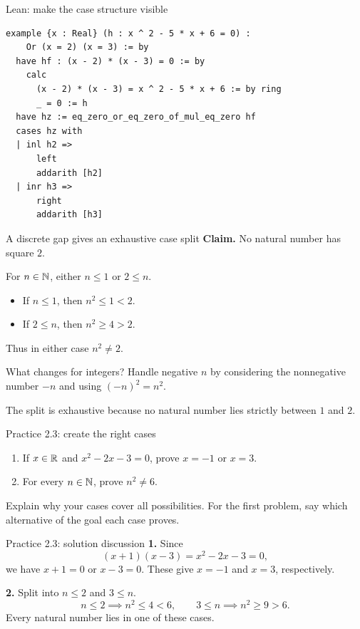 \begin{frame}[fragile]{Lean: make the case structure visible}
\begin{lstlisting}
example {x : Real} (h : x ^ 2 - 5 * x + 6 = 0) :
    Or (x = 2) (x = 3) := by
  have hf : (x - 2) * (x - 3) = 0 := by
    calc
      (x - 2) * (x - 3) = x ^ 2 - 5 * x + 6 := by ring
      _ = 0 := h
  have hz := eq_zero_or_eq_zero_of_mul_eq_zero hf
  cases hz with
  | inl h2 =>
      left
      addarith [h2]
  | inr h3 =>
      right
      addarith [h3]
\end{lstlisting}
\end{frame}

\begin{frame}{A discrete gap gives an exhaustive case split}
\textbf{Claim.} No natural number has square $2$.

For $n\in\mathbb{N}$, either $n\le1$ or $2\le n$.
\begin{itemize}
\item If $n\le1$, then $n^2\le1<2$.
\item If $2\le n$, then $n^2\ge4>2$.
\end{itemize}
Thus in either case $n^2\ne2$.
\begin{block}{What changes for integers?}
Handle negative $n$ by considering the nonnegative number $-n$ and using $(-n)^2=n^2$.
\end{block}
The split is exhaustive because no natural number lies strictly between $1$ and $2$.
\end{frame}

\begin{frame}{Practice 2.3: create the right cases}
\begin{enumerate}
\item If $x\in\mathbb{R}$ and $x^2-2x-3=0$, prove $x=-1$ or $x=3$.
\item For every $n\in\mathbb{N}$, prove $n^2\ne6$.
\end{enumerate}
\vspace{1em}
Explain why your cases cover all possibilities.
For the first problem, say which alternative of the goal each case proves.
\end{frame}

\begin{frame}{Practice 2.3: solution discussion}
\textbf{1.} Since
\[
(x+1)(x-3)=x^2-2x-3=0,
\]
we have $x+1=0$ or $x-3=0$.
These give $x=-1$ and $x=3$, respectively.
\medskip

\textbf{2.} Split into $n\le2$ and $3\le n$.
\[
n\le2\implies n^2\le4<6,
\qquad
3\le n\implies n^2\ge9>6.
\]
Every natural number lies in one of these cases.
\end{frame}

